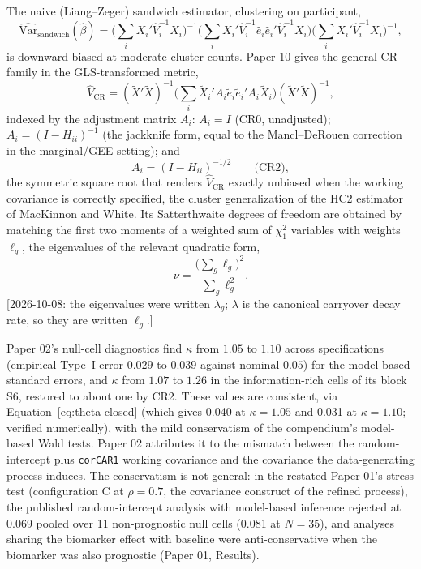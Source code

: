 \documentclass[11pt]{article}
\newcommand{\note}[1]{\textcolor{blue!60!black}{\small [#1]}}
\newcommand{\code}[1]{\texttt{#1}}
\begin{document}
The naive (Liang--Zeger) sandwich estimator, clustering on participant,
\begin{equation}
\widehat{\mathrm{Var}}_{\mathrm{sandwich}}(\hat\beta) =
  \Big(\textstyle\sum_i X_i' \hat V_i^{-1} X_i\Big)^{-1}
  \Big(\textstyle\sum_i X_i' \hat V_i^{-1} \hat e_i \hat e_i'
  \hat V_i^{-1} X_i\Big)
  \Big(\textstyle\sum_i X_i' \hat V_i^{-1} X_i\Big)^{-1},
\label{eq:sandwich}
\end{equation}
is downward-biased at moderate cluster counts. Paper 10 gives the
general CR family in the GLS-transformed metric,
\begin{equation}
\hat V_{\mathrm{CR}} = (\tilde X'\tilde X)^{-1}
  \Big(\textstyle\sum_i \tilde X_i' A_i \tilde e_i \tilde e_i' A_i
  \tilde X_i\Big) (\tilde X'\tilde X)^{-1},
\label{eq:cr-family}
\end{equation}
indexed by the adjustment matrix $A_i$: $A_i = I$ (CR0, unadjusted);
$A_i = (I-H_{ii})^{-1}$ (the jackknife form, equal to the
Mancl--DeRouen correction in the marginal/GEE setting); and
\begin{equation}
A_i = (I - H_{ii})^{-1/2} \qquad \text{(CR2)},
\label{eq:cr2}
\end{equation}
the symmetric square root that renders $\hat V_{\mathrm{CR}}$ exactly
unbiased when the working covariance is correctly specified, the
cluster generalization of the HC2 estimator of MacKinnon and White.
Its Satterthwaite degrees of freedom are obtained by matching the
first two moments of a weighted sum of $\chi^2_1$ variables with
weights $\ell_g$, the eigenvalues of the relevant quadratic form,
\begin{equation}
\nu = \frac{\big(\sum_g \ell_g\big)^2}{\sum_g \ell_g^2}.
\label{eq:cr2-df}
\end{equation}
\note{2026-10-08: the eigenvalues were written $\lambda_g$; $\lambda$ is
the canonical carryover decay rate, so they are written $\ell_g$.}

Paper 02's null-cell diagnostics find $\kappa$ from $1.05$ to $1.10$
across specifications (empirical Type~I error $0.029$ to $0.039$
against nominal $0.05$) for the model-based standard errors, and
$\kappa$ from $1.07$ to $1.26$ in the information-rich cells of its
block S6, restored to about one by CR2. These values are consistent,
via Equation~\eqref{eq:theta-closed} (which gives 0.040 at
$\kappa = 1.05$ and 0.031 at $\kappa = 1.10$; verified numerically),
with the mild conservatism of the compendium's model-based Wald tests.
Paper 02 attributes it to the mismatch between the random-intercept
plus \code{corCAR1} working covariance and the covariance the
data-generating process induces. The conservatism is not general: in
the restated Paper 01's stress test (configuration C at $\rho = 0.7$,
the covariance construct of the refined process), the
published random-intercept analysis with model-based inference rejected
at 0.069 pooled over 11 non-prognostic null cells (0.081 at $N = 35$),
and analyses sharing the biomarker effect with baseline were
anti-conservative when the biomarker was also prognostic (Paper 01,
Results).
\end{document}
